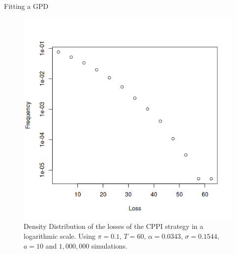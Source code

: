 \documentclass[10pt]{beamer}
\begin{document}
\begin{frame}[fragile]{Fitting a GPD}
  \begin{figure}[h]
    \centering
    \includegraphics[scale=0.45]{cppi-dens-points.png}
    \caption{Density Distribution of the losses of the CPPI strategy in a logarithmic scale. Using $\pi = 0.1$, $T=60$, $\alpha = 0.0343$, $\sigma = 0.1544$, $a=10$ and $1,000,000$ simulations.}
    \label{fig:cppi-dens-points}
  \end{figure}
\end{frame}
\end{document}
